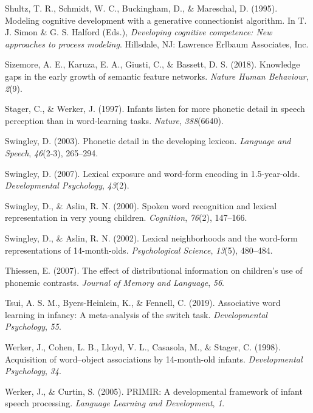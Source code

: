 \documentclass[english,,man]{apa6}
\begin{document}
\leavevmode\hypertarget{ref-shultz1995}{}%
Shultz, T. R., Schmidt, W. C., Buckingham, D., \& Mareschal, D. (1995). Modeling cognitive development with a generative connectionist algorithm. In T. J. Simon \& G. S. Halford (Eds.), \emph{Developing cognitive competence: New approaches to process modeling}. Hillsdale, NJ: Lawrence Erlbaum Associates, Inc.

\leavevmode\hypertarget{ref-sizemore2018}{}%
Sizemore, A. E., Karuza, E. A., Giusti, C., \& Bassett, D. S. (2018). Knowledge gaps in the early growth of semantic feature networks. \emph{Nature Human Behaviour}, \emph{2}(9).

\leavevmode\hypertarget{ref-stager1997}{}%
Stager, C., \& Werker, J. (1997). Infants listen for more phonetic detail in speech perception than in word-learning tasks. \emph{Nature}, \emph{388}(6640).

\leavevmode\hypertarget{ref-swingley2003}{}%
Swingley, D. (2003). Phonetic detail in the developing lexicon. \emph{Language and Speech}, \emph{46}(2-3), 265--294.

\leavevmode\hypertarget{ref-swingley2007}{}%
Swingley, D. (2007). Lexical exposure and word-form encoding in 1.5-year-olds. \emph{Developmental Psychology}, \emph{43}(2).

\leavevmode\hypertarget{ref-swingley2000}{}%
Swingley, D., \& Aslin, R. N. (2000). Spoken word recognition and lexical representation in very young children. \emph{Cognition}, \emph{76}(2), 147--166.

\leavevmode\hypertarget{ref-swingley2002}{}%
Swingley, D., \& Aslin, R. N. (2002). Lexical neighborhoods and the word-form representations of 14-month-olds. \emph{Psychological Science}, \emph{13}(5), 480--484.

\leavevmode\hypertarget{ref-thiessen2007}{}%
Thiessen, E. (2007). The effect of distributional information on children's use of phonemic contrasts. \emph{Journal of Memory and Language}, \emph{56}.

\leavevmode\hypertarget{ref-tsui2019}{}%
Tsui, A. S. M., Byers-Heinlein, K., \& Fennell, C. (2019). Associative word learning in infancy: A meta-analysis of the switch task. \emph{Developmental Psychology}, \emph{55}.

\leavevmode\hypertarget{ref-werker1998}{}%
Werker, J., Cohen, L. B., Lloyd, V. L., Casasola, M., \& Stager, C. (1998). Acquisition of word--object associations by 14-month-old infants. \emph{Developmental Psychology}, \emph{34}.

\leavevmode\hypertarget{ref-werker2005}{}%
Werker, J., \& Curtin, S. (2005). PRIMIR: A developmental framework of infant speech processing. \emph{Language Learning and Development}, \emph{1}.
\end{document}
